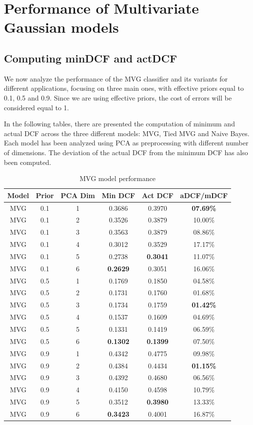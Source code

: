\documentclass[12pt, a4paper]{article}
\begin{document}
\section{Performance of Multivariate Gaussian models}
\subsection{Computing minDCF and actDCF}

We now analyze the performance of the MVG classifier and its variants for different applications, focusing on three main ones, with effective priors equal to 0.1, 0.5 and 0.9. Since we are using effective priors, the cost of errors will be considered equal to 1.

In the following tables, there are presented the computation of minimum and actual DCF across the three different models: MVG, Tied MVG and Naive Bayes. Each model has been analyzed using PCA as preprocessing with different number of dimensions. The deviation of the actual DCF from the minimum DCF has also been computed.

\begin{table}[ht!]
	\centering
	\begin{tabular}{| | c c c c c c | |}
		\hline
		Model & Prior & PCA Dim & Min DCF & Act DCF & aDCF/mDCF \\
		\hline\hline
		MVG & 0.1 & 1 & 0.3686 & 0.3970 & \textbf{07.69\%} \\
		\hline
		MVG & 0.1 & 2 & 0.3526 & 0.3879 & 10.00\% \\
		\hline
		MVG & 0.1 & 3 & 0.3563 & 0.3879 & 08.86\% \\
		\hline
		MVG & 0.1 & 4 & 0.3012 & 0.3529 & 17.17\% \\
		\hline
		MVG & 0.1 & 5 & 0.2738 & \textbf{0.3041} & 11.07\% \\
		\hline
		MVG & 0.1 & 6 & \textbf{0.2629} & 0.3051 & 16.06\% \\
		\hline\hline
		MVG & 0.5 & 1 & 0.1769 & 0.1850 & 04.58\% \\
		\hline
		MVG & 0.5 & 2 & 0.1731 & 0.1760 & 01.68\% \\
		\hline
		MVG & 0.5 & 3 & 0.1734 & 0.1759 & \textbf{01.42\%} \\
		\hline
		MVG & 0.5 & 4 & 0.1537 & 0.1609 & 04.69\% \\
		\hline
		MVG & 0.5 & 5 & 0.1331 & 0.1419 & 06.59\% \\
		\hline
		MVG & 0.5 & 6 & \textbf{0.1302} & \textbf{0.1399} & 07.50\% \\
		\hline\hline
		MVG & 0.9 & 1 & 0.4342 & 0.4775 & 09.98\% \\
		\hline
		MVG & 0.9 & 2 & 0.4384 & 0.4434 & \textbf{01.15\%} \\
		\hline
		MVG & 0.9 & 3 & 0.4392 & 0.4680 & 06.56\% \\
		\hline
		MVG & 0.9 & 4 & 0.4150 & 0.4598 & 10.79\% \\
		\hline
		MVG & 0.9 & 5 & 0.3512 & \textbf{0.3980} & 13.33\% \\
		\hline
		MVG & 0.9 & 6 & \textbf{0.3423} & 0.4001 & 16.87\% \\
		\hline
	\end{tabular}
	\caption{MVG model performance}
\end{table}
\end{document}
